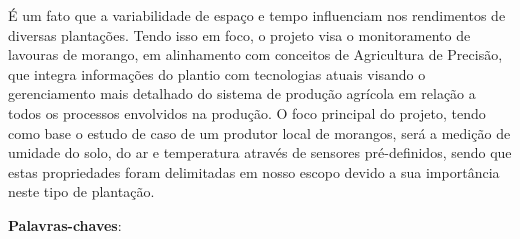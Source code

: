 \begin{resumo}
É um fato que a variabilidade de espaço e tempo influenciam nos rendimentos de diversas plantações.
Tendo isso em foco, o projeto visa o monitoramento de lavouras de morango, em alinhamento com conceitos de Agricultura de
Precisão, que integra informações do plantio com tecnologias atuais visando o gerenciamento mais detalhado do sistema de
produção agrícola em relação a todos os processos envolvidos na produção.
O foco principal do projeto, tendo como base o estudo de caso de um produtor local de morangos, será a medição de umidade do solo,
do ar e temperatura através de sensores pré-definidos, sendo que estas propriedades foram delimitadas em nosso
escopo devido a sua importância neste tipo de plantação.
 \vspace{\onelineskip}

 \noindent
 \textbf{Palavras-chaves}:
\end{resumo}
